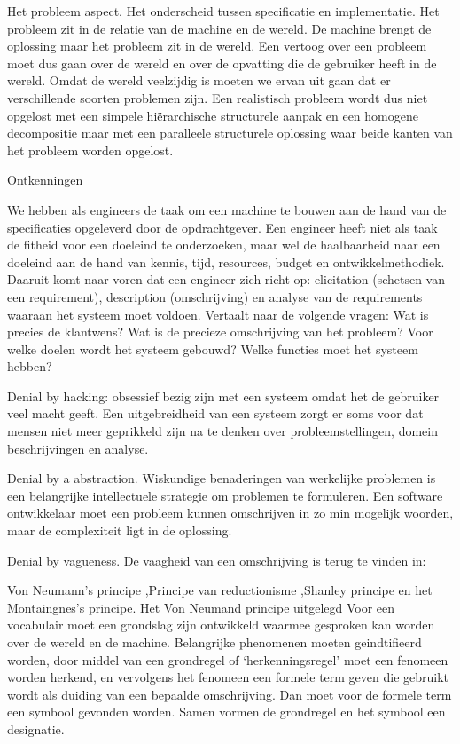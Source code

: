 Het probleem aspect. Het onderscheid tussen specificatie en implementatie. Het probleem zit in de relatie van de machine en de wereld. De machine brengt de oplossing maar het probleem zit in de wereld. Een vertoog over een probleem moet dus gaan over de wereld en over de opvatting die de gebruiker heeft in de wereld. Omdat de wereld veelzijdig is moeten we ervan uit gaan dat er verschillende soorten problemen zijn. Een realistisch probleem wordt dus niet opgelost met een simpele hiërarchische structurele aanpak en een homogene decompositie maar met een paralleele structurele oplossing waar beide kanten van het probleem worden opgelost. 



Ontkenningen 

We hebben als engineers de taak om een machine te bouwen aan de hand van de specificaties opgeleverd door de opdrachtgever. Een engineer heeft niet als taak de fitheid voor een doeleind te onderzoeken, maar wel de haalbaarheid naar een doeleind aan de hand van kennis, tijd, resources, budget en ontwikkelmethodiek. Daaruit komt naar voren dat een engineer zich richt op: elicitation (schetsen van een requirement), description (omschrijving) en analyse van de requirements waaraan het systeem moet voldoen. Vertaalt naar de volgende vragen: Wat is precies de klantwens?  Wat is de precieze omschrijving van het probleem? Voor welke doelen wordt het systeem gebouwd? Welke functies moet het systeem hebben? 

Denial by hacking: obsessief bezig zijn met een systeem omdat het de gebruiker veel macht geeft. Een uitgebreidheid van een systeem zorgt er soms voor dat mensen niet meer geprikkeld zijn na te denken over probleemstellingen, domein beschrijvingen en analyse. 

Denial by a abstraction. Wiskundige benaderingen van werkelijke problemen is  een belangrijke intellectuele strategie om problemen te formuleren. Een software ontwikkelaar moet een probleem kunnen omschrijven in zo min mogelijk woorden, maar de complexiteit ligt in de oplossing. 

Denial by vagueness. De vaagheid van een omschrijving is terug te vinden in: 

Von Neumann’s principe ,Principe van reductionisme ,Shanley principe en het Montaingnes’s principe.
Het Von Neumand principe uitgelegd
Voor een vocabulair  moet een grondslag zijn ontwikkeld waarmee gesproken kan worden over de wereld en de machine. Belangrijke phenomenen moeten geindtifieerd worden, door middel van een grondregel  of ‘herkenningsregel’ moet een fenomeen worden herkend, en vervolgens het fenomeen een formele term geven die gebruikt wordt als duiding van een bepaalde omschrijving. Dan moet voor de formele term een symbool gevonden worden. Samen vormen de grondregel en het symbool een designatie. 

